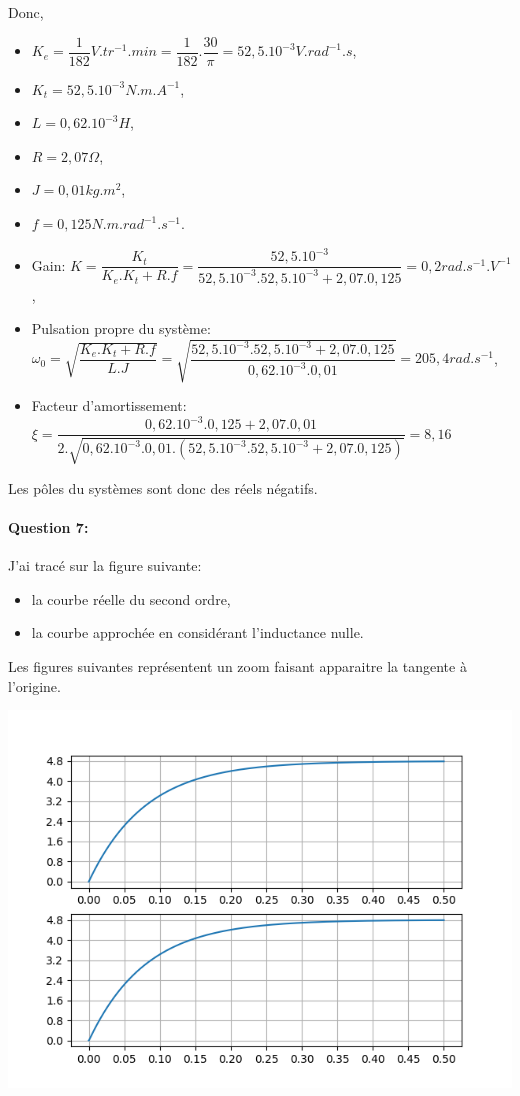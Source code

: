 Donc,

\begin{itemize}
 \item $K_e=\dfrac{1}{182}V.tr^{-1}.min=\dfrac{1}{182}.\dfrac{30}{\pi}=52,5.10^{-3}V.rad^{-1}.s$,
 \item $K_t=52,5.10^{-3}N.m.A^{-1}$,
 \item $L=0,62.10^{-3}H$,
 \item $R=2,07\Omega$,
 \item $J=0,01kg.m^2$,
 \item $f=0,125N.m.rad^{-1}.s^{-1}$.
\end{itemize}

\begin{itemize}
 \item Gain: $K=\dfrac{K_t}{K_e.K_t+R.f}=\dfrac{52,5.10^{-3}}{52,5.10^{-3}.52,5.10^{-3}+2,07.0,125}=0,2rad.s^{-1}.V^{-1}$,
 \item Pulsation propre du système: $\omega_0=\sqrt{\dfrac{K_e.K_t+R.f}{L.J}}=\sqrt{\dfrac{52,5.10^{-3}.52,5.10^{-3}+2,07.0,125}{0,62.10^{-3}.0,01}}=205,4rad.s^{-1}$,
 \item Facteur d'amortissement: $\xi=\dfrac{0,62.10^{-3}.0,125+2,07.0,01}{2.\sqrt{0,62.10^{-3}.0,01.(52,5.10^{-3}.52,5.10^{-3}+2,07.0,125)}}=8,16$
\end{itemize}

Les pôles du systèmes sont donc des réels négatifs.

\paragraph{Question 7:}

J'ai tracé sur la figure suivante:
\begin{itemize}
 \item la courbe réelle du second ordre,
 \item la courbe approchée en considérant l'inductance nulle.
\end{itemize}

Les figures suivantes représentent un zoom faisant apparaitre la tangente à l'origine.
\begin{center}
	\includegraphics[width=0.7\linewidth]{img/courbe1}
\end{center}

